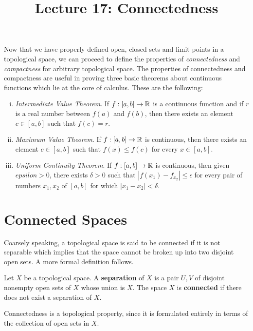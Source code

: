 \documentclass[a4paper,english,12pt]{article}
\title{Lecture 17: Connectedness}
\author{}
\begin{document}
\maketitle

Now that we have properly defined open, closed sets and limit points in a topological space, we can proceed to define the properties of 
\textit{connectedness} and \textit{compactness} for arbitrary topological space. The properties of connectedness and compactness are useful in proving 
three basic theorems about continuous functions which lie at the core of calculus. These are the following:

\begin{enumerate} [i)]
 \item \textit{Intermediate Value Theorem}.  If $f:[a, b] \to \mathbb{R}$ is a continuous function and if $r$ is a real number between $f(a)$ and $f(b)$, then 
 there exists an element $c \in [a, b]$ such that $f(c) = r$.
 
 \item \textit{Maximum Value Theorem}. If $f:[a,b] \to \mathbb{R}$ is continuous, then there exists an element $c \in [a, b]$ such that $f(x) \le f(c)$
 for every $x \in [a, b]$.
 
 \item \textit{Uniform Continuity Theorem}. If $f:[a,b] \to \mathbb{R}$ is continuous, then given $epsilon > 0$, there exists $\delta > 0$ 
 such that $|f(x_{1}) - f_{x_{2}}| \le \epsilon$ for every pair of numbers $x_{1}, x_{2}$ of $[a, b]$ for which $|x_{1} - x_{2}| < \delta$.
\end{enumerate}


\section{Connected Spaces}

Coarsely speaking, a topological space is said to be connected if it is not separable which implies that the space cannot be broken up into two disjoint open sets.
A more formal definition follows.

\begin{defn} 
Let $X$ be a topological space. A \textbf{separation} of $X$ is a pair $U, V$ of disjoint nonempty open sets of $X$ whose union is $X$.
The space $X$ is \textbf{connected} if there does not exist a separation of $X$. 
\end{defn}

Connectedness is a topological property, since it is formulated entirely in terms of the collection of open sets in $X$. 
\end{document}
